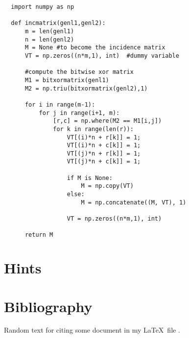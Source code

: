 \documentclass[12pt]{scrartcl}
\begin{document}
\begin{verbatim}
  import numpy as np
      
  def incmatrix(genl1,genl2):
      m = len(genl1)
      n = len(genl2)
      M = None #to become the incidence matrix
      VT = np.zeros((n*m,1), int)  #dummy variable
      
      #compute the bitwise xor matrix
      M1 = bitxormatrix(genl1)
      M2 = np.triu(bitxormatrix(genl2),1) 

      for i in range(m-1):
          for j in range(i+1, m):
              [r,c] = np.where(M2 == M1[i,j])
              for k in range(len(r)):
                  VT[(i)*n + r[k]] = 1;
                  VT[(i)*n + c[k]] = 1;
                  VT[(j)*n + r[k]] = 1;
                  VT[(j)*n + c[k]] = 1;
                  
                  if M is None:
                      M = np.copy(VT)
                  else:
                      M = np.concatenate((M, VT), 1)
                  
                  VT = np.zeros((n*m,1), int)
      
      return M
\end{verbatim}

\newpage

\section{Hints}


\printhint

\newpage

\section{Bibliography}


Random text for citing some document in my \LaTeX\ file \cite{knuth1997}.

\printbibliography
\end{document}
